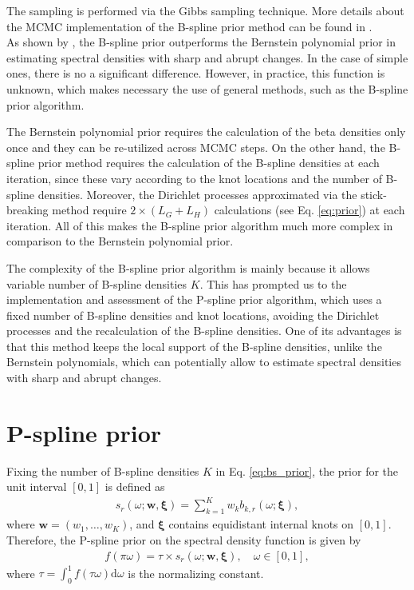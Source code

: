 \documentclass[aps,reprint,amsmath,amssymb,showpacs,showkeys]{revtex4-1}%
\begin{document}
The sampling is performed via the Gibbs sampling technique.  More details about the MCMC implementation of the B-spline prior method can be found in \cite{Edwards2018}.\\

As shown by \cite{Edwards2018}, the B-spline prior outperforms the Bernstein polynomial prior in estimating spectral densities with sharp and abrupt changes. In the case of simple ones, there is no a significant difference.  However, in practice, this function is unknown, which makes necessary the use of general methods, such as the B-spline prior algorithm.  

The Bernstein polynomial prior requires the calculation of the beta densities only once and they can be re-utilized across MCMC steps.  On the other hand, the B-spline prior method requires the calculation of the B-spline densities at each iteration, since these vary according to the knot locations and the number of B-spline densities.  Moreover, the Dirichlet processes approximated via the stick-breaking method require $2\!\times\!(L_G + L_H)$ calculations (see Eq. \eqref{eq:prior}) at each iteration.  All of this makes the B-spline prior algorithm much more complex in comparison to the Bernstein polynomial prior. 

The complexity of the B-spline prior algorithm is mainly because it allows variable number of B-spline densities $K$.  This has prompted us to the implementation and assessment of the P-spline prior algorithm, which uses a fixed number of B-spline densities and knot locations, avoiding the Dirichlet processes and the recalculation of the B-spline densities.  One of its advantages is that this method keeps the local support of the B-spline densities, unlike the Bernstein polynomials, which can potentially allow to estimate spectral densities with sharp and abrupt changes.


\section{P-spline prior}

Fixing the number of B-spline densities $K$ in Eq. \eqref{eq:bs_prior}, the prior for the unit interval $[0,1]$ is defined as
\begin{align*}
	s_r(\omega;\bm{w}, \bm{\xi}) = \sum_{k=1}^{K} w_{k} b_{k,r}(\omega;\bm{\xi}),	
\end{align*}
where $\bm{w} = (w_1,\dots,w_K)$, and $\bm{\xi}$ contains equidistant internal knots on $[0,1]$.  Therefore, the P-spline prior on the spectral density function is given by
\begin{align*}
f(\pi \omega) = \tau \times s_r(\omega;\bm{w}, \bm{\xi}), \quad \omega \in [0,1],
\end{align*}
where $\tau = \int_{0}^{1}f(\tau \omega)\text{d}\omega$ is the normalizing constant.
\end{document}
